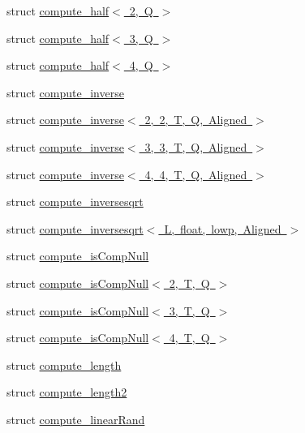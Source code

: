 \begin{DoxyCompactItemize}
struct \mbox{\hyperlink{structglm_1_1detail_1_1compute__half_3_012_00_01_q_01_4}{compute\+\_\+half$<$ 2, Q $>$}}
\item 
struct \mbox{\hyperlink{structglm_1_1detail_1_1compute__half_3_013_00_01_q_01_4}{compute\+\_\+half$<$ 3, Q $>$}}
\item 
struct \mbox{\hyperlink{structglm_1_1detail_1_1compute__half_3_014_00_01_q_01_4}{compute\+\_\+half$<$ 4, Q $>$}}
\item 
struct \mbox{\hyperlink{structglm_1_1detail_1_1compute__inverse}{compute\+\_\+inverse}}
\item 
struct \mbox{\hyperlink{structglm_1_1detail_1_1compute__inverse_3_012_00_012_00_01_t_00_01_q_00_01_aligned_01_4}{compute\+\_\+inverse$<$ 2, 2, T, Q, Aligned $>$}}
\item 
struct \mbox{\hyperlink{structglm_1_1detail_1_1compute__inverse_3_013_00_013_00_01_t_00_01_q_00_01_aligned_01_4}{compute\+\_\+inverse$<$ 3, 3, T, Q, Aligned $>$}}
\item 
struct \mbox{\hyperlink{structglm_1_1detail_1_1compute__inverse_3_014_00_014_00_01_t_00_01_q_00_01_aligned_01_4}{compute\+\_\+inverse$<$ 4, 4, T, Q, Aligned $>$}}
\item 
struct \mbox{\hyperlink{structglm_1_1detail_1_1compute__inversesqrt}{compute\+\_\+inversesqrt}}
\item 
struct \mbox{\hyperlink{structglm_1_1detail_1_1compute__inversesqrt_3_01_l_00_01float_00_01lowp_00_01_aligned_01_4}{compute\+\_\+inversesqrt$<$ L, float, lowp, Aligned $>$}}
\item 
struct \mbox{\hyperlink{structglm_1_1detail_1_1compute__is_comp_null}{compute\+\_\+is\+Comp\+Null}}
\item 
struct \mbox{\hyperlink{structglm_1_1detail_1_1compute__is_comp_null_3_012_00_01_t_00_01_q_01_4}{compute\+\_\+is\+Comp\+Null$<$ 2, T, Q $>$}}
\item 
struct \mbox{\hyperlink{structglm_1_1detail_1_1compute__is_comp_null_3_013_00_01_t_00_01_q_01_4}{compute\+\_\+is\+Comp\+Null$<$ 3, T, Q $>$}}
\item 
struct \mbox{\hyperlink{structglm_1_1detail_1_1compute__is_comp_null_3_014_00_01_t_00_01_q_01_4}{compute\+\_\+is\+Comp\+Null$<$ 4, T, Q $>$}}
\item 
struct \mbox{\hyperlink{structglm_1_1detail_1_1compute__length}{compute\+\_\+length}}
\item 
struct \mbox{\hyperlink{structglm_1_1detail_1_1compute__length2}{compute\+\_\+length2}}
\item 
struct \mbox{\hyperlink{structglm_1_1detail_1_1compute__linear_rand}{compute\+\_\+linear\+Rand}}

\end{DoxyCompactItemize}

